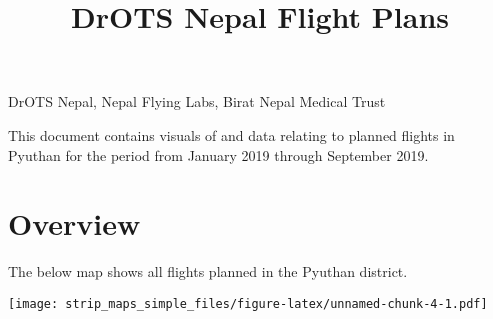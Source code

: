 \documentclass[]{article}
\title{DrOTS Nepal Flight Plans}
\author{}
\date{}
\begin{document}
\maketitle

\begin{center}
\begin{large}

DrOTS Nepal, Nepal Flying Labs, Birat Nepal Medical Trust

\end{large}
\end{center}

\vspace{5mm}

\vspace{5mm}

\begin{center}
\begin{changemargin}{3cm}{3cm} 

This document contains visuals of and data relating to planned flights in Pyuthan for the period from January 2019 through September 2019.

\end{changemargin}
\end{center}

\vspace{20mm}

\noindent{}

\vfill
\null

\vspace{3mm}

\newpage

\section{Overview}\label{overview}

The below map shows all flights planned in the Pyuthan district.

\texttt{[image: strip\_maps\_simple\_files/figure-latex/unnamed-chunk-4-1.pdf]}
\end{document}
